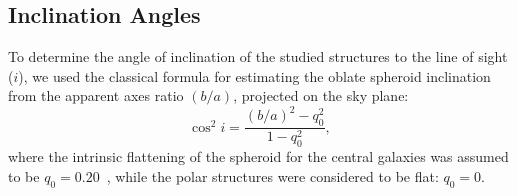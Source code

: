 \documentclass{ab}
\begin{document}
\subsection{Inclination Angles}

To determine the angle of inclination of the studied structures to
the line of sight ($i$), we used the classical formula for
estimating the oblate spheroid inclination from the apparent
axes ratio $(b/a)$, projected on the sky plane:
\begin{equation}
\cos^{2} i = \frac{(b/a)^{2} - q^2_0}{1-q^2_0},
\label{eq1}
\end{equation}
where the intrinsic flattening of the spheroid for \linebreak  the
central galaxies was assumed to be \linebreak
 \mbox{$q_0 = 0.20$}~\citep{Hubble_1926}, while
 the polar structures were considered to be flat:  \mbox{$q_0 = 0$}.
\end{document}
